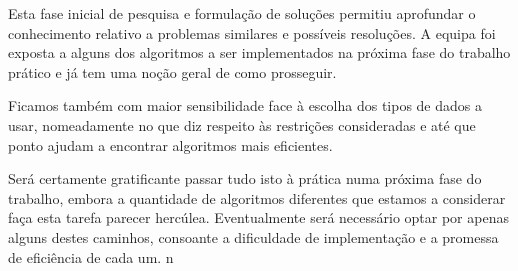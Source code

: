 \documentclass[12pt,a4paper,reqno]{report}
\numberwithin{figure}{section}
\numberwithin{equation}{section}
\numberwithin{figure}{section}
\numberwithin{equation}{section}
\begin{document}
Esta fase inicial de pesquisa e formulação de soluções permitiu aprofundar o conhecimento relativo a problemas similares e possíveis resoluções. A equipa foi exposta a alguns dos algoritmos a ser implementados na próxima fase do trabalho prático e já tem uma noção geral de como prosseguir.

Ficamos também com maior sensibilidade face à escolha dos tipos de dados a usar, nomeadamente no que diz respeito às restrições consideradas e até que ponto ajudam a encontrar algoritmos mais eficientes.

Será certamente gratificante passar tudo isto à prática numa próxima fase do trabalho, embora a quantidade de algoritmos diferentes que estamos a considerar faça esta tarefa parecer hercúlea. Eventualmente será necessário optar por apenas alguns destes caminhos, consoante a dificuldade de implementação e a promessa de eficiência de cada um. n



\end{document}
